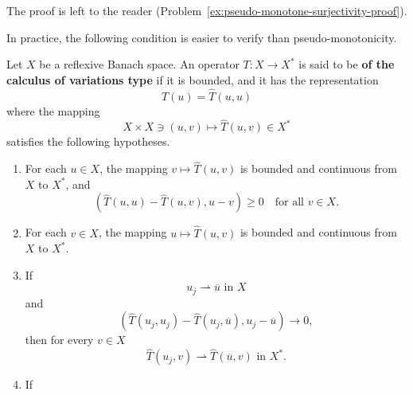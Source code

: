 The proof is left to the reader (Problem~\ref{ex:pseudo-monotone-surjectivity-proof}).

In practice, the following condition is easier to verify than pseudo-monotonicity.

\begin{Definition}
\label{def:calculus-variations-type-operator}
Let $X$ be a reflexive Banach space. An operator $T:X\to X^*$ is said to be \textbf{of the calculus of variations type} if it is bounded, and it has the representation
\begin{equation}\label{eq:calculus-variations-type-diagonal-representation}
T(u)=\widehat T(u,u)
\end{equation}
where the mapping
\begin{equation}\label{eq:calculus-variations-type-two-argument-mapping}
X\times X\ni(u,v)\mapsto\widehat T(u,v)\in X^*
\end{equation}
satisfies the following hypotheses.\begin{enumerate}[label=CV-\arabic*.,ref=CV-\arabic*]\item\label{hyp:cv-diagonal-monotonicity} For each $u\in X$, the mapping $v\mapsto\widehat T(u,v)$ is bounded and continuous from $X$ to $X^*$, and
\begin{equation}\label{eq:calculus-variations-type-diagonal-monotonicity}
(\widehat T(u,u)-\widehat T(u,v),u-v)\geq0\quad\text{for all }v\in X.
\end{equation}
\item\label{hyp:cv-first-variable-continuity} For each $v\in X$, the mapping $u\mapsto\widehat T(u,v)$ is bounded and continuous from $X$ to $X^*$.\item\label{hyp:cv-vanishing-defect-weak-continuity} If
\begin{equation}\label{eq:calculus-variations-type-cv-three-weak-sequence}
u_j\rightharpoonup\overline u\text{ in }X
\end{equation}
and
\begin{equation}\label{eq:calculus-variations-type-vanishing-diagonal-pairing}
(\widehat T(u_j,u_j)-\widehat T(u_j,\overline u),u_j-\overline u)\to0,
\end{equation}
then for every $v\in X$
\begin{equation}\label{eq:calculus-variations-type-weak-image-continuity}
\widehat T(u_j,v)\rightharpoonup\widehat T(\overline u,v)\text{ in }X^*.
\end{equation}
\item\label{hyp:cv-weak-duality-pairing} If
\begin{equation}\label{eq:calculus-variations-type-cv-four-weak-sequence}

\end{equation}
\end{enumerate}
\end{Definition}
